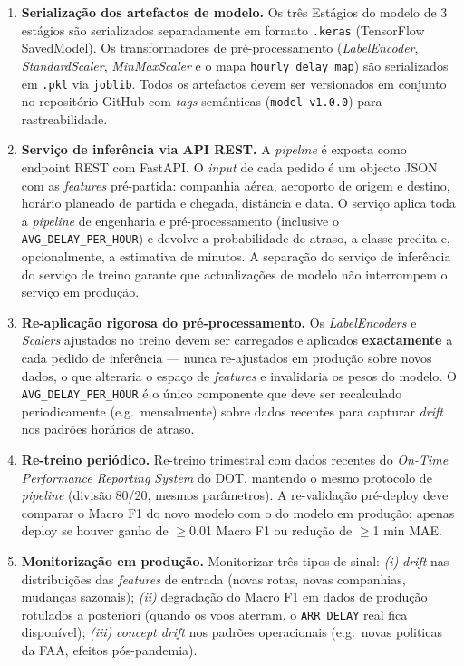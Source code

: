 \documentclass[conference]{IEEEtran}
\begin{document}
\begin{enumerate}
\item \textbf{Serialização dos artefactos de modelo.}
  Os três Estágios do modelo de 3 estágios são serializados separadamente
  em formato \texttt{.keras} (TensorFlow SavedModel). Os transformadores de
  pré-processamento (\textit{LabelEncoder}, \textit{StandardScaler},
  \textit{MinMaxScaler} e o mapa \texttt{hourly\_delay\_map}) são serializados
  em \texttt{.pkl} via \texttt{joblib}. Todos os artefactos devem ser
  versionados em conjunto no repositório GitHub com \textit{tags} semânticas
  (\texttt{model-v1.0.0}) para rastreabilidade.

\item \textbf{Serviço de inferência via API REST.}
  A \textit{pipeline} é exposta como endpoint REST com FastAPI. O
  \textit{input} de cada pedido é um objecto JSON com as \textit{features}
  pré-partida: companhia aérea, aeroporto de origem e destino, horário
  planeado de partida e chegada, distância e data. O serviço aplica toda
  a \textit{pipeline} de engenharia e pré-processamento (inclusive o
  \texttt{AVG\_DELAY\_PER\_HOUR}) e devolve a probabilidade de atraso,
  a classe predita e, opcionalmente, a estimativa de minutos. A separação
  do serviço de inferência do serviço de treino garante que actualizações
  de modelo não interrompem o serviço em produção.

\item \textbf{Re-aplicação rigorosa do pré-processamento.}
  Os \textit{LabelEncoders} e \textit{Scalers} ajustados no treino devem ser
  carregados e aplicados \textbf{exactamente} a cada pedido de inferência —
  nunca re-ajustados em produção sobre novos dados, o que alteraria o espaço
  de \textit{features} e invalidaria os pesos do modelo. O
  \texttt{AVG\_DELAY\_PER\_HOUR} é o único componente que deve ser
  recalculado periodicamente (e.g.\ mensalmente) sobre dados recentes para
  capturar \textit{drift} nos padrões horários de atraso.

\item \textbf{Re-treino periódico.}
  Re-treino trimestral com dados recentes do \textit{On-Time Performance
  Reporting System} do DOT, mantendo o mesmo protocolo de \textit{pipeline}
  (divisão 80/20, mesmos parâmetros). A re-validação pré-deploy deve comparar
  o Macro F1 do novo modelo com o do modelo em produção; apenas deploy se
  houver ganho de $\geq$0.01 Macro F1 ou redução de $\geq$1 min MAE.

\item \textbf{Monitorização em produção.}
  Monitorizar três tipos de sinal: \emph{(i)} \textit{drift} nas distribuições
  das \textit{features} de entrada (novas rotas, novas companhias, mudanças
  sazonais); \emph{(ii)} degradação do Macro F1 em dados de produção rotulados
  a posteriori (quando os voos aterram, o \texttt{ARR\_DELAY} real fica
  disponível); \emph{(iii)} \textit{concept drift} nos padrões operacionais
  (e.g.\ novas politicas da FAA, efeitos pós-pandemia).
\end{enumerate}
\end{document}
